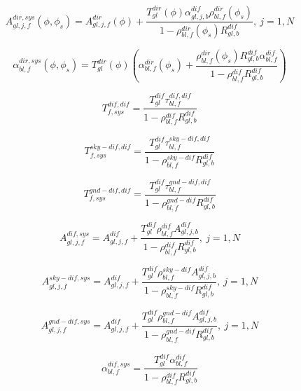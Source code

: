 \begin{equation}
A_{gl,j,f}^{dir,sys}(\phi ,{\phi_s}) = A_{gl,j,f}^{dir}(\phi ) + \frac{{T_{gl}^{dir}(\phi )\alpha_{gl,j,b}^{dif}\rho_{bl,f}^{dir}({\phi_s})}}{{1 - \rho_{bl,f}^{dir}({\phi_s})R_{gl,b}^{dif}}}{\mathrm{,    }}~j = 1,N
\end{equation}

\begin{equation}
\alpha_{bl,f}^{dir,sys}(\phi ,{\phi_s}) = T_{gl}^{dir}(\phi )\left( {\alpha_{bl,f}^{dir}({\phi_s}) + \frac{{\rho_{bl,f}^{dir}({\phi_s})R_{gl,b}^{dif}\alpha_{bl,f}^{dif}}}{{1 - \rho_{bl,f}^{dif}R_{gl,b}^{dif}}}} \right)
\end{equation}

\begin{equation}
T_{f,sys}^{dif,dif} = \frac{{T_{gl}^{dif}\tau_{bl,f}^{dif,dif}}}{{1 - \rho_{bl,f}^{dif}R_{gl,b}^{dif}}}
\end{equation}

\begin{equation}
T_{f,sys}^{sky - dif,dif} = \frac{{T_{gl}^{dif}\tau_{bl,f}^{sky - dif,dif}}}{{1 - \rho_{bl,f}^{sky - dif}R_{gl,b}^{dif}}}
\end{equation}

\begin{equation}
T_{f,sys}^{gnd - dif,dif} = \frac{{T_{gl}^{dif}\tau_{bl,f}^{gnd - dif,dif}}}{{1 - \rho_{bl,f}^{gnd - dif}R_{gl,b}^{dif}}}
\end{equation}

\begin{equation}
A_{gl,j,f}^{dif,sys} = A_{gl,j,f}^{dif} + \frac{{T_{gl}^{dif}\rho_{bl,f}^{dif}A_{gl,j,b}^{dif}}}{{1 - \rho_{bl,f}^{dif}R_{gl,b}^{dif}}}{\mathrm{,    }}~j = 1,N
\end{equation}

\begin{equation}
A_{gl,j,f}^{sky - dif,sys} = A_{gl,j,f}^{dif} + \frac{{T_{gl}^{dif}\rho_{bl,f}^{sky - dif}A_{gl,j,b}^{dif}}}{{1 - \rho_{bl,f}^{sky - dif}R_{gl,b}^{dif}}}{\mathrm{,    }}~j = 1,N
\end{equation}

\begin{equation}
A_{gl,j,f}^{gnd - dif,sys} = A_{gl,j,f}^{dif} + \frac{{T_{gl}^{dif}\rho_{bl,f}^{gnd - dif}A_{gl,j,b}^{dif}}}{{1 - \rho_{bl,f}^{gnd - dif}R_{gl,b}^{dif}}}{\mathrm{,    }}~j = 1,N
\end{equation}

\begin{equation}
\alpha_{bl,f}^{dif,sys} = \frac{{T_{gl}^{dif}\alpha_{bl,f}^{dif}}}{{1 - \rho_{bl,f}^{dif}R_{gl,b}^{dif}}}
\end{equation}

